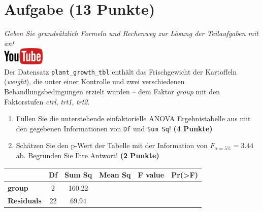 \documentclass[a4paper, 9pt]{scrartcl}\usepackage[]{graphicx}\usepackage[]{xcolor}
\begin{document}
\clearpage

\section{Aufgabe \hfill (13 Punkte)}

\textit{Geben Sie grunds{\"a}tzlich Formeln und Rechenweg zur L{\"o}sung der
  Teilaufgaben mit an!} \\[1Ex]

\hfill\href{https://youtu.be/49hvImMwVyE}{\includegraphics[width =
  2cm]{img/youtube}}\\[1Ex]




Der Datensatz \texttt{plant\_growth\_tbl} enth{\"a}lt das Frischgewicht der Kartoffeln
(\textit{weight}), die unter einer Kontrolle und zwei verschiedenen
Behandlungsbedingungen erzielt wurden -- dem Faktor \textit{group} mit den
Faktorstufen \textit{ctrl}, \textit{trt1}, \textit{trt2}.



\begin{enumerate}
\item F{\"u}llen Sie die unterstehende einfaktorielle ANOVA Ergebnistabelle aus
  mit den gegebenen Informationen von \texttt{Df} und \texttt{Sum Sq}!
  \textbf{(4 Punkte)}
\item Sch{\"a}tzen Sie den p-Wert der Tabelle mit der Information von
  $F_{\alpha = 5\%} = 3.44$ ab. Begr{\"u}nden Sie Ihre
  Antwort! \textbf{(2 Punkte)}
\end{enumerate}

\vspace{1Ex}

\begin{center}
  \Large
  \begin{tabular}{l|c|c|c|c|c}
     & \textbf{Df} & \textbf{Sum Sq} & \textbf{Mean Sq} & \textbf{F value} & \textbf{Pr(>F)} \strut\\
    \hline
   \textbf{group}  & 2 & 160.22 &  &  &  \strut\\
    \hline
   \textbf{Residuals}  & 22 & 69.94 &  &  &  \strut\\
  \end{tabular}
\end{center}
\end{document}
